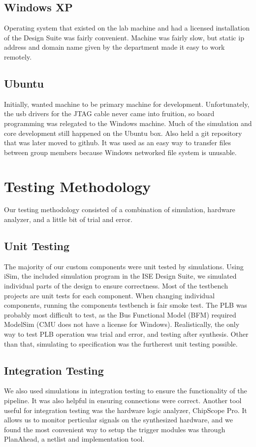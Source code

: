 \documentclass[letterpaper,10pt]{article}
\begin{document}
\subsection{Windows XP}
Operating system that existed on the lab machine and had a licensed installation of the Design Suite was fairly convenient.  Machine was fairly slow, but static ip address and domain name given by the department made it easy to work remotely.

\subsection{Ubuntu}
Initially, wanted machine to be primary machine for development.  Unfortunately, the usb drivers for the JTAG cable never came into fruition, so board programming was relegated to the Windows machine.  Much of the simulation and core development still happened on the Ubuntu box.  Also held a git repository that was later moved to github.  It was used as an easy way to transfer files between group members because Windows networked file system is unusable.  

\section{Testing Methodology}
Our testing methodology consisted of a combination of simulation, hardware analyzer, and a little bit of trial and error.

\subsection{Unit Testing}
The majority of our custom components were unit tested by simulations. Using iSim, the included simulation program in the ISE Design Suite, we simulated individual parts of the design to ensure correctness.  Most of the testbench projects are unit tests for each component.  When changing individual components, running the components testbench is fair smoke test.  The PLB was probably most difficult to test, as the Bus Functional Model (BFM) required ModelSim (CMU does not have a license for Windows).  Realistically, the only way to test PLB operation was trial and error, and testing after synthesis.  Other than that, simulating to specification was the furtherest unit testing possible. 

\subsection{Integration Testing}
We also used simulations in integration testing to ensure the functionality of the pipeline.  It was also helpful in ensuring connections were correct.  Another tool useful for integration testing was the hardware logic analyzer, ChipScope Pro.  It allows us to monitor perticular signals on the synthesized hardware, and we found the most convenient way to setup the trigger modules was through PlanAhead, a netlist and implementation tool.  
\end{document}
